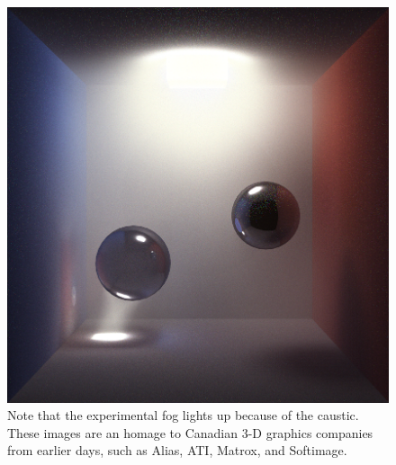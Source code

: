 \documentclass[12pt]{article}
\begin{document}
\begin{figure} 
\centering
  \includegraphics[width = 6 in]{fog4.png}
  \caption{ Note that the experimental fog lights up because of the caustic.
These images are an homage to Canadian 3-D graphics companies from earlier days, such as Alias, ATI, Matrox, and Softimage.
}
\end{figure}
\end{document}
